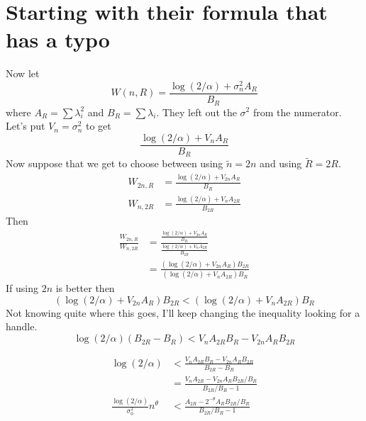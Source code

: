 \documentclass{article}
\newcommand{\art}[1]{\begingroup\color{blue}#1\endgroup}
\begin{document}
\section*{Starting with their formula that has a typo}

Now let
$$
W(n,R) = \frac{\log(2/\alpha)+\sigma_n^2A_R}{B_R}
$$
where $A_R=\sum\lambda_i^2$ and $B_R=\sum\lambda_i$.
They left out the $\sigma^2$ from the numerator.
Let's put $V_n = \sigma^2_n$ to get
$$
\frac{\log(2/\alpha)+V_nA_R}{B_R}
$$
Now suppose that we get to choose between using
$\tilde n=2n$ and using $\tilde R=2R$.
\begin{align*}
W_{2n,R} & = \frac{\log(2/\alpha)+V_{2n}A_R}{B_R}\\
W_{n,2R} & = \frac{\log(2/\alpha)+V_{n}A_{2R}}{B_{2R}}
\end{align*}
Then
\begin{align*}
\frac{W_{2n,R}}{W_{n,2R}} 
& = \frac{\frac{\log(2/\alpha)+V_{2n}A_R}{B_R}}
{\frac{\log(2/\alpha)+V_{n}A_{2R}}{B_{2R}}}\\
& = \frac{(\log(2/\alpha)+V_{2n}A_R)B_{2R}}
{(\log(2/\alpha)+V_{n}A_{2R})B_R}
\end{align*}
If using $2n$ is better then
$$
(\log(2/\alpha)+V_{2n}A_R)B_{2R}<
(\log(2/\alpha)+V_{n}A_{2R})B_R
$$
\art{Not knowing quite where this goes, I'll keep
changing the inequality looking for a handle.}
$$
\log(2/\alpha)(B_{2R}-B_R)
< V_nA_{2R}B_R - V_{2n}A_RB_{2R}
$$

\begin{align*}
\log(2/\alpha)
&< \frac{V_nA_{2R}B_R - V_{2n}A_RB_{2R}}{B_{2R}-B_R}\\
&= \frac{V_nA_{2R} - V_{2n}A_RB_{2R}/B_R}{B_{2R}/B_R-1}\\
\frac{\log(2/\alpha)}{\sigma^2_0}n^\theta
&<\frac{A_{2R} - 2^{-\theta}A_RB_{2R}/B_R}{B_{2R}/B_R-1}
\end{align*}







\end{document}
